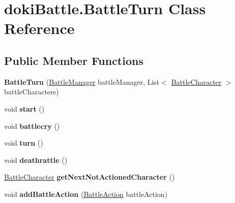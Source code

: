 \hypertarget{classdoki_battle_1_1_battle_turn}{}\section{doki\+Battle.\+Battle\+Turn Class Reference}
\label{classdoki_battle_1_1_battle_turn}
\subsection*{Public Member Functions}
\begin{DoxyCompactItemize}
\item 
{\bfseries Battle\+Turn} (\hyperlink{classdoki_battle_1_1_battle_manager}{Battle\+Manager} battle\+Manager, List$<$ \hyperlink{classdoki_battle_1_1_battle_character}{Battle\+Character} $>$ battle\+Characters)\hypertarget{classdoki_battle_1_1_battle_turn_a8ed47e54cc11945786b31d7c5e8d1ab4}{}\label{classdoki_battle_1_1_battle_turn_a8ed47e54cc11945786b31d7c5e8d1ab4}

\item 
void {\bfseries start} ()\hypertarget{classdoki_battle_1_1_battle_turn_a13d8ae5b233506141e30c91f10667fca}{}\label{classdoki_battle_1_1_battle_turn_a13d8ae5b233506141e30c91f10667fca}

\item 
void {\bfseries battlecry} ()\hypertarget{classdoki_battle_1_1_battle_turn_ae55e22695a45238ea2bf824cc688aa7d}{}\label{classdoki_battle_1_1_battle_turn_ae55e22695a45238ea2bf824cc688aa7d}

\item 
void {\bfseries turn} ()\hypertarget{classdoki_battle_1_1_battle_turn_a645223bbe30259e06b9cb94ebc70ee4e}{}\label{classdoki_battle_1_1_battle_turn_a645223bbe30259e06b9cb94ebc70ee4e}

\item 
void {\bfseries deathrattle} ()\hypertarget{classdoki_battle_1_1_battle_turn_a5e338d7d75beed5b51a6f85295b62d0d}{}\label{classdoki_battle_1_1_battle_turn_a5e338d7d75beed5b51a6f85295b62d0d}

\item 
\hyperlink{classdoki_battle_1_1_battle_character}{Battle\+Character} {\bfseries get\+Next\+Not\+Actioned\+Character} ()\hypertarget{classdoki_battle_1_1_battle_turn_ae1865cabba1b19c961197a7ba701ca0e}{}\label{classdoki_battle_1_1_battle_turn_ae1865cabba1b19c961197a7ba701ca0e}

\item 
void {\bfseries add\+Battle\+Action} (\hyperlink{classdoki_battle_1_1_battle_action}{Battle\+Action} battle\+Action)\hypertarget{classdoki_battle_1_1_battle_turn_a6ed851d33421f65ca8b9152adebfe90d}{}\label{classdoki_battle_1_1_battle_turn_a6ed851d33421f65ca8b9152adebfe90d}

\end{DoxyCompactItemize}
